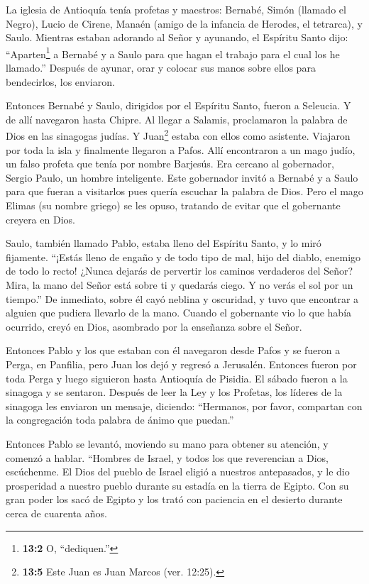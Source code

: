  La iglesia de Antioquía tenía profetas y maestros: Bernabé,
Simón (llamado el Negro), Lucio de Cirene, Manaén (amigo de la infancia
de Herodes, el tetrarca), y Saulo.  Mientras estaban
adorando al Señor y ayunando, el Espíritu Santo dijo:
``Aparten\footnote{\textbf{13:2} O, ``dediquen.''} a Bernabé y a Saulo
para que hagan el trabajo para el cual los he llamado.'' 
Después de ayunar, orar y colocar sus manos sobre ellos para
bendecirlos, los enviaron.

 Entonces Bernabé y Saulo, dirigidos por el Espíritu Santo,
fueron a Seleucia. Y de allí navegaron hasta Chipre.  Al
llegar a Salamis, proclamaron la palabra de Dios en las sinagogas
judías. Y Juan\footnote{\textbf{13:5} Este Juan es Juan Marcos (ver.
  12:25).} estaba con ellos como asistente.  Viajaron por
toda la isla y finalmente llegaron a Pafos. Allí encontraron a un mago
judío, un falso profeta que tenía por nombre Barjesús.  Era
cercano al gobernador, Sergio Paulo, un hombre inteligente. Este
gobernador invitó a Bernabé y a Saulo para que fueran a visitarlos pues
quería escuchar la palabra de Dios.  Pero el mago Elimas (su
nombre griego) se les opuso, tratando de evitar que el gobernante
creyera en Dios.

 Saulo, también llamado Pablo, estaba lleno del Espíritu
Santo, y lo miró fijamente.  ``¡Estás lleno de engaño y de
todo tipo de mal, hijo del diablo, enemigo de todo lo recto! ¿Nunca
dejarás de pervertir los caminos verdaderos del Señor? 
Mira, la mano del Señor está sobre ti y quedarás ciego. Y no verás el
sol por un tiempo.'' De inmediato, sobre él cayó neblina y oscuridad, y
tuvo que encontrar a alguien que pudiera llevarlo de la mano.
 Cuando el gobernante vio lo que había ocurrido, creyó en
Dios, asombrado por la enseñanza sobre el Señor.

 Entonces Pablo y los que estaban con él navegaron desde
Pafos y se fueron a Perga, en Panfilia, pero Juan los dejó y regresó a
Jerusalén.  Entonces fueron por toda Perga y luego
siguieron hasta Antioquía de Pisidia. El sábado fueron a la sinagoga y
se sentaron.  Después de leer la Ley y los Profetas, los
líderes de la sinagoga les enviaron un mensaje, diciendo: ``Hermanos,
por favor, compartan con la congregación toda palabra de ánimo que
puedan.''

 Entonces Pablo se levantó, moviendo su mano para obtener
su atención, y comenzó a hablar. ``Hombres de Israel, y todos los que
reverencian a Dios, escúchenme.  El Dios del pueblo de
Israel eligió a nuestros antepasados, y le dio prosperidad a nuestro
pueblo durante su estadía en la tierra de Egipto. Con su gran poder los
sacó de Egipto  y los trató con paciencia en el desierto
durante cerca de cuarenta años.

